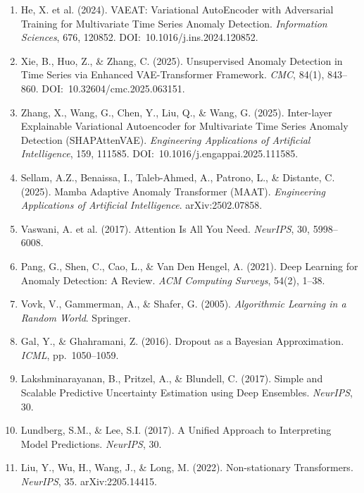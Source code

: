 \documentclass[12pt,a4paper]{article}
\begin{document}
\begin{enumerate}
\item[\lbrack A1\rbrack] He, X. et al. (2024). VAEAT: Variational AutoEncoder
with Adversarial Training for Multivariate Time Series Anomaly Detection.
\textit{Information Sciences}, 676, 120852. DOI:~10.1016/j.ins.2024.120852.

\item[\lbrack A2\rbrack] Xie, B., Huo, Z., \& Zhang, C. (2025). Unsupervised
Anomaly Detection in Time Series via Enhanced VAE-Transformer Framework.
\textit{CMC}, 84(1), 843--860. DOI:~10.32604/cmc.2025.063151.

\item[\lbrack A3\rbrack] Zhang, X., Wang, G., Chen, Y., Liu, Q., \& Wang, G.
(2025). Inter-layer Explainable Variational Autoencoder for Multivariate Time
Series Anomaly Detection (SHAPAttenVAE). \textit{Engineering Applications of
Artificial Intelligence}, 159, 111585. DOI:~10.1016/j.engappai.2025.111585.

\item[\lbrack A4\rbrack] Sellam, A.Z., Benaissa, I., Taleb-Ahmed, A.,
Patrono, L., \& Distante, C. (2025). Mamba Adaptive Anomaly Transformer (MAAT).
\textit{Engineering Applications of Artificial Intelligence}. arXiv:2502.07858.

\item[] Vaswani, A. et al. (2017). Attention Is All You Need.
\textit{NeurIPS}, 30, 5998--6008.

\item[] Pang, G., Shen, C., Cao, L., \& Van Den Hengel, A. (2021). Deep
Learning for Anomaly Detection: A Review. \textit{ACM Computing Surveys},
54(2), 1--38.

\item[] Vovk, V., Gammerman, A., \& Shafer, G. (2005).
\textit{Algorithmic Learning in a Random World}. Springer.

\item[] Gal, Y., \& Ghahramani, Z. (2016). Dropout as a Bayesian Approximation.
\textit{ICML}, pp.~1050--1059.

\item[] Lakshminarayanan, B., Pritzel, A., \& Blundell, C. (2017). Simple and
Scalable Predictive Uncertainty Estimation using Deep Ensembles. \textit{NeurIPS}, 30.

\item[] Lundberg, S.M., \& Lee, S.I. (2017). A Unified Approach to Interpreting
Model Predictions. \textit{NeurIPS}, 30.

\item[] Liu, Y., Wu, H., Wang, J., \& Long, M. (2022). Non-stationary
Transformers. \textit{NeurIPS}, 35. arXiv:2205.14415.


\end{enumerate}
\end{document}
